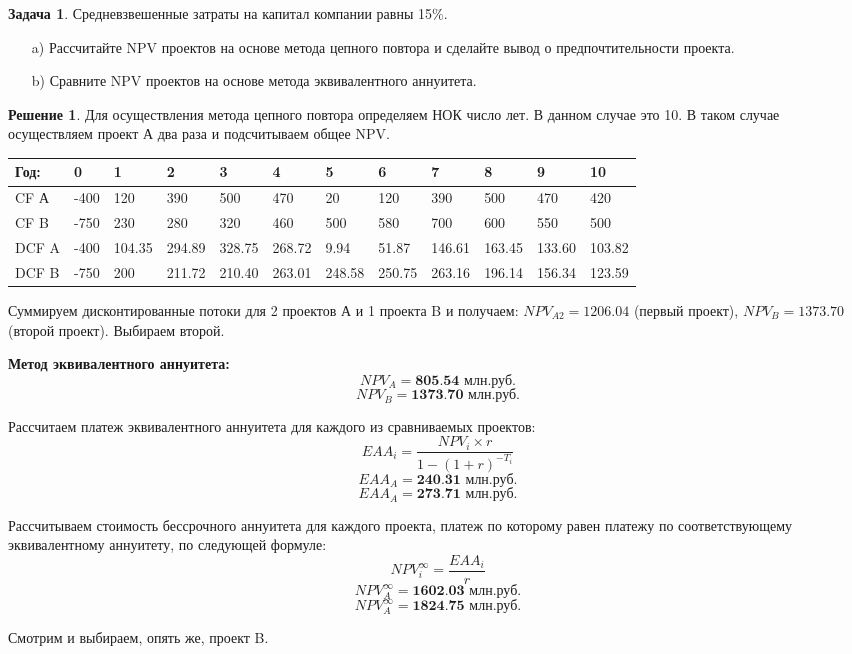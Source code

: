 \documentclass[a4paper, 14pt]{article}
\theoremstyle{plain} %
\theoremstyle{definition} %
\newtheorem*{solution}{Решение}
\newtheorem{problem}{Задача}[subsection]
\theoremstyle{remark} %
\begin{document}
\begin{problem}
Средневзвешенные затраты на капитал компании равны 15\%.
\begin{itemize}
	\item[a)] Рассчитайте NPV проектов на основе метода цепного повтора и сделайте вывод о предпочтительности проекта.
	\item[b)] Сравните NPV проектов на основе метода эквивалентного аннуитета.
\end{itemize}
	\begin{solution}
		Для осуществления метода цепного повтора определяем НОК число лет. В данном случае это 10. В таком случае осуществляем проект А два раза и подсчитываем общее NPV.
\begin{center}
\begin{tabular}[0.6\textwidth]{|p{0.74cm}|l|l|l|l|l|l|l|l|l|l|l|}
\hline
Год:                               & 0       & 1      & 2      & 3      & 4      & 5      & 6      & 7      & 8      & 9      & 10      \\
\hline
CF А & -400    & 120    & 390    & 500    & 470    & 20     & 120    & 390    & 500    & 470    & 420     \\
\hline
CF B & -750    & 230    & 280    & 320    & 460    & 500    & 580    & 700    & 600    & 550    & 500     \\
\hline
DCF A                      & -400    & 104.35 & 294.89 & 328.75 & 268.72 & 9.94   & 51.87  & 146.61 & 163.45 & 133.60 & 103.82  \\
\hline
DCF B                      & -750    & 200    & 211.72 & 210.40 & 263.01 & 248.58 & 250.75 & 263.16 & 196.14 & 156.34 & 123.59  \\
\hline
\end{tabular}
\end{center}
Суммируем дисконтированные потоки для 2 проектов А и 1 проекта B и получаем: $NPV_{A2} = 1206.04$ (первый проект), $NPV_{B} = 1373.70$ (второй проект). Выбираем второй.

\vspace{1em}
\textbf{Метод эквивалентного аннуитета:}
	\[NPV_{A} = \textbf{805.54 млн.руб.} \]
	\[NPV_{B} = \textbf{1373.70 млн.руб.} \]

Рассчитаем платеж эквивалентного аннуитета для каждого из сравниваемых проектов:
	\[EAA_{i} = \frac{NPV_{i} \times r}{1-(1+r)^{-T_{i}}}\]
	\[EAA_{A} = \textbf{240.31 млн.руб.}\]
	\[EAA_{A} = \textbf{273.71 млн.руб.}\]

Рассчитываем стоимость бессрочного аннуитета для каждого проекта, платеж по которому равен платежу по соответствующему эквивалентному аннуитету, по следующей формуле:
	\[NPV_{i}^{\infty} = \frac{EAA_{i}}{r}\]
	\[NPV_{A}^{\infty} = \textbf{1602.03 млн.руб.}\]
	\[NPV_{A}^{\infty} = \textbf{1824.75 млн.руб.}\]

Смотрим и выбираем, опять же, проект B.
	\end{solution}
\end{problem}
\end{document}
